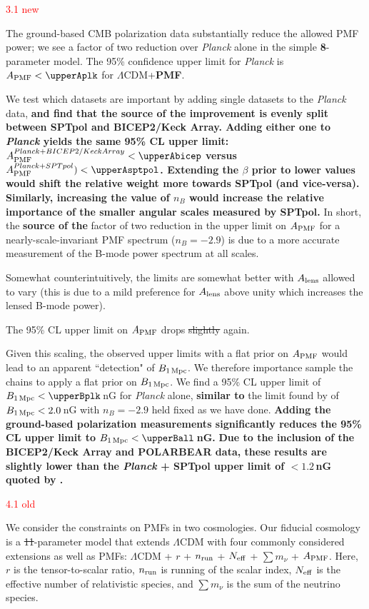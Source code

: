 \documentclass{article}
\newcommand{\apmf}{\ensuremath{A_{\rm PMF}}}
\newcommand{\bpmf}{\ensuremath{B_{\rm 1\,Mpc}}}
\newcommand{\alens}{\ensuremath{A_{\rm lens}}}
\newcommand{\lcdm}{\ensuremath{\Lambda}CDM}
\newcommand{\nrun}{\ensuremath{n_{\rm run}}}
\newcommand{\neff}{\ensuremath{N_{\rm eff}}}
\newcommand{\mnu}{\ensuremath{\sum m_\nu}}
\newcommand{\planck}{{\sl Planck}}
\newcommand{\bicepkeck}{BICEP2/Keck Array}
\newcommand{\sptpol}{SPTpol}
\newcommand{\changed}[1]{\textcolor{Red}{#1}}
\newcommand{\removed}[1]{\st{#1}}
\newcommand{\added}[1]{\textbf{#1}}
\begin{document}
\changed{3.1 new}

The ground-based CMB polarization data  substantially reduce the allowed PMF power; we see a factor of two reduction over \planck{} alone in the simple \added{8}-parameter model. 
The 95\% confidence upper limit for \planck{} is $\apmf <  \upperAplk$ for \lcdm{}+\added{PMF}. 

We test which datasets are important by adding single datasets to the \planck{} data, \added{and find that the source of the improvement is evenly split between \sptpol{} and \bicepkeck{}.
Adding either one to \planck{} yields the same 95\% CL upper limit: $\apmf^{\planck+\bicepkeck} <  \upperAbicep$ versus  $\apmf^{\planck+\sptpol}) < \upperAsptpol$. 
Extending the $\beta$ prior to lower values would shift the relative weight more towards \sptpol{} (and vice-versa). 
Similarly, increasing the value of $n_B$ would  increase the relative importance of the smaller angular scales measured by \sptpol.}
In short, the \added{source of the} factor of two reduction in the upper limit on \apmf{} for a nearly-scale-invariant PMF spectrum ($n_B=-2.9$) is due to a more accurate measurement of the B-mode power spectrum at all scales.

Somewhat counterintuitively, the limits are somewhat better with \alens{} allowed to vary (this is due to a mild preference for \alens{} above unity which increases the lensed B-mode power). 

The 95\% CL upper limit on \apmf{} drops \removed{slightly} again.

Given this scaling, the observed upper limits with a flat prior on \apmf{} would lead to an apparent ``detection" of \bpmf. 
We therefore importance sample the chains to apply a flat prior on \bpmf. 
We find a 95\% CL upper limit of $\bpmf < \upperBplk$\,nG for \planck{} alone,
\added{similar to} the limit found by \citet{planck15-19} of $\bpmf < 2.0$\,nG with $n_B=-2.9$ held fixed as we have done. 
\added{Adding the ground-based polarization measurements significantly reduces the 95\% CL upper limit to $\bpmf < \upperBall$\,nG. }
\added{Due to the inclusion of the \bicepkeck{} and POLARBEAR data, these results are slightly lower than the \planck{} + \sptpol{} upper limit of $<1.2\,$nG quoted by \citet{zucca16}.}

\changed{4.1 old}

We consider the constraints on PMFs in two cosmologies. 
Our fiducial cosmology is a \removed{11}-parameter model that extends \lcdm{} with  four  commonly considered extensions as well as PMFs:  \lcdm{} +  $r$ + \nrun{} +  \neff{} + \mnu{} + \apmf. 
Here, $r$ is the tensor-to-scalar ratio, \nrun{} is running of the scalar index, \neff{} is the effective number of relativistic species, and \mnu{} is the sum of the neutrino species. 
\end{document}

